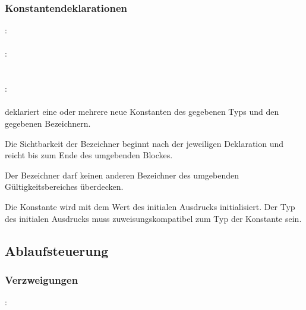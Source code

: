 \subsubsection{Konstantendeklarationen}\label{Konstantendeklarationen}
:\label{dekl_konst}\\
\hspace*{1cm}\Gspace{} \Gspace{} \\
:\label{dekl_konst_bzch_init_liste}\\
\hspace*{1cm} \\
\hspace*{1cm} \Gspace\Gt{,}\Gspace{} \\
:\label{dekl_konst_bzch_init}\\
\hspace*{1cm} \Gspace\Gt{=}\Gspace{} \\

 deklariert eine oder mehrere neue Konstanten des gegebenen Typs und den gegebenen Bezeichnern.

Die Sichtbarkeit der Bezeichner beginnt nach der jeweiligen Deklaration
und reicht bis zum Ende des umgebenden Blockes.

Der Bezeichner darf keinen anderen Bezeichner des umgebenden Gültigkeitsbereiches überdecken.

Die Konstante wird mit dem Wert des initialen Ausdrucks initialisiert.
Der Typ des initialen Ausdrucks muss zuweisungskompatibel zum Typ der Konstante sein.

\subsection{Ablaufsteuerung}\label{Ablaufsteuerung}
\subsubsection{Verzweigungen}\label{Verzweigungen}
:\label{verzweigung}\\
\hspace*{1cm}\Gspace\Gt{(}\Gspace{} \Gspace\Gt{)}\Gspace\Gt{\{}\Gspace{} \Gspace\Gt{\}}\\
\hspace*{1cm}\Gspace\Gt{(}\Gspace{} \Gspace\Gt{)}\Gspace\Gt{\{}\Gspace{} \Gspace\Gt{\}}\Gspace{}\Gspace\Gt{\{}\Gspace{} \Gspace\Gt{\}}\\

